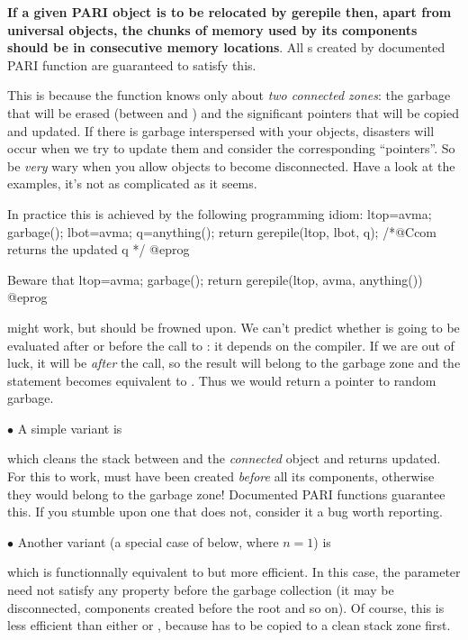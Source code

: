 {\bf If a given PARI object is to be relocated by \hbox{gerepile} then,
apart from universal objects, the chunks of memory used by its components
should be in consecutive memory locations}. All s created by
documented PARI function are guaranteed to satisfy this.

This is because the  function knows only about \emph{two
connected zones}: the garbage that will be erased (between  and
) and the  significant pointers that will be copied and updated.
If there is garbage interspersed with your objects, disasters will occur when
we try to update them and consider the corresponding ``pointers''. So be
\emph{very} wary when you allow objects to become disconnected. Have a look
at the examples, it's not as complicated as it seems.

\noindent In practice this is achieved by the following programming idiom:
\bprog
  ltop=avma; garbage(); lbot=avma; q=anything();
  return gerepile(ltop, lbot, q); /*@Ccom returns the updated q */
@eprog

\noindent Beware that
\bprog
  ltop=avma; garbage();
  return gerepile(ltop, avma, anything())
@eprog

\noindent might work, but should be frowned upon. We can't predict whether
 is going to be evaluated after or before the call to
: it depends on the compiler. If we are out of luck, it will
be \emph{after} the call, so the result will belong to the garbage zone and
the  statement becomes equivalent to . Thus we
would return a pointer to random garbage.

\noindent$\bullet$ A simple variant is


\noindent which cleans the stack between  and the \emph{connected}
object  and returns  updated. For this to work,  must
have been created \emph{before} all its components, otherwise they would
belong to the garbage zone! Documented PARI functions guarantee this. If you
stumble upon one that does not, consider it a bug worth reporting.

\noindent$\bullet$ Another variant (a special case of 
below, where $n=1$) is


\noindent which is functionnally equivalent to  but more efficient. In this case, the  parameter 
need not satisfy any property before the garbage collection (it may be
disconnected, components created before the root and so on). Of course, this
is less efficient than either  or , because
 has to be copied to a clean stack zone first.

